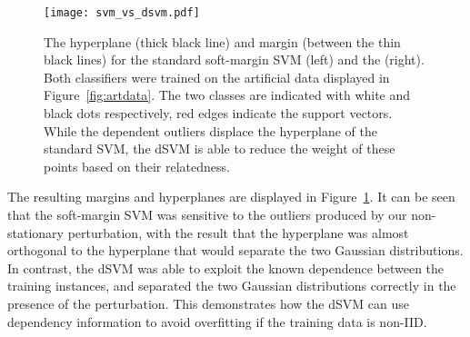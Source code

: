 \begin{figure}
  \center
  \texttt{[image: svm\_vs\_dsvm.pdf]}
  \caption{The hyperplane (thick black line) and margin (between the thin black
    lines) for the standard soft-margin \protect\ac{SVM} (left) and the
     (right). Both classifiers were trained on the artificial data
    displayed in Figure~\ref{fig:artdata}. The two classes are indicated with
    white and black dots respectively, red edges indicate the support vectors.
    While the dependent outliers displace the hyperplane of the standard
    \protect\ac{SVM}, the \protect\ac{dSVM} is able to reduce the weight of
    these points based on their relatedness.}
  \label{fig:svm_vs_dsvm}
\end{figure}

The resulting margins and hyperplanes are displayed in
Figure~\ref{fig:svm_vs_dsvm}. It can be seen that the soft-margin \ac{SVM} was
sensitive to the outliers produced by our non-stationary perturbation, with the
result that the hyperplane was almost orthogonal to the hyperplane that would
separate the two Gaussian distributions. In contrast, the \ac{dSVM} was able to
exploit the known dependence between the training instances, and separated the
two Gaussian distributions correctly in the presence of the perturbation. This
demonstrates how the \ac{dSVM} can use dependency information to avoid
overfitting if the training data is non-\ac{IID}.
